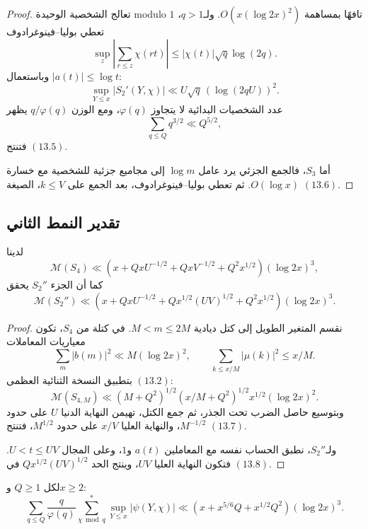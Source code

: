 \begin{proof}
تعالج الشخصية الوحيدة modulo \(1\) تافهًا بمساهمة
\(O(x(\log 2x)^2)\). ولـ\(q>1\)، تعطي بوليا--فينوغرادوف
\[
\sup_z\left|\sum_{r\le z}\chi(rt)\right|
\le |\chi(t)|\sqrt q\log(2q).
\]
وباستعمال \(|a(t)|\le\log t\):
\[
\sup_{Y\le x}|S_2'(Y,\chi)|
\ll U\sqrt q\,(\log(2qU))^2.
\]
عدد الشخصيات البدائية لا يتجاوز \(\varphi(q)\)، ومع الوزن
\(q/\varphi(q)\) يظهر
\[
\sum_{q\le Q}q^{3/2}\ll Q^{5/2},
\]
فتنتج \((13.5)\).

أما \(S_3\)، فالجمع الجزئي يرد عامل \(\log m\) إلى مجاميع جزئية للشخصية
مع خسارة \(O(\log x)\). ثم تعطي بوليا--فينوغرادوف، بعد الجمع على
\(k\le V\)، الصيغة \((13.6)\).
\end{proof}

\subsection{تقدير النمط الثاني}

\begin{lemma}
\label{lem:chapter13-type-two}
\provedhere
لدينا
\[
\mathcal M(S_4)
\ll
\left(
x+QxU^{-1/2}+QxV^{-1/2}+Q^2x^{1/2}
\right)(\log 2x)^3,
\tag{13.7}
\]
كما أن الجزء \(S_2''\) يحقق
\[
\mathcal M(S_2'')
\ll
\left(
x+QxU^{-1/2}+Qx^{1/2}(UV)^{1/2}+Q^2x^{1/2}
\right)(\log 2x)^3.
\tag{13.8}
\]
\end{lemma}

\begin{proof}
نقسم المتغير الطويل إلى كتل ديادية \(M<m\le2M\). في كتلة من \(S_4\)،
تكون معياريات المعاملات
\[
\sum_m|b(m)|^2\ll M(\log 2x)^2,
\qquad
\sum_{k\le x/M}|\mu(k)|^2\le x/M.
\]
بتطبيق النسخة الثنائية العظمى \((13.2)\):
\[
\mathcal M(S_{4,M})
\ll
(M+Q^2)^{1/2}(x/M+Q^2)^{1/2}
 x^{1/2}(\log 2x)^2.
\]
وبتوسيع حاصل الضرب تحت الجذر، ثم جمع الكتل، تهيمن النهاية الدنيا \(U\)
على حدود \(M^{-1/2}\)، والنهاية العليا \(x/V\) على حدود \(M^{1/2}\)،
فتنتج \((13.7)\).

ولـ\(S_2''\)، نطبق الحساب نفسه مع المعاملين \(a(t)\) و\(1\)، وعلى المجال
\(U<t\le UV\). فتكون النهاية العليا \(UV\)، وينتج الحد
\(Qx^{1/2}(UV)^{1/2}\) في \((13.8)\).
\end{proof}

\begin{theorem}
\label{thm:chapter13-character-mean-value}
\provedhere
لكل \(Q\ge1\) و\(x\ge2\):
\[
\sum_{q\le Q}\frac{q}{\varphi(q)}
\sum_{\chi\bmod q}^{*}
\sup_{Y\le x}|\psi(Y,\chi)|
\ll
\left(x+x^{5/6}Q+x^{1/2}Q^2\right)(\log 2x)^3.
\tag{13.9}
\]
\end{theorem}

